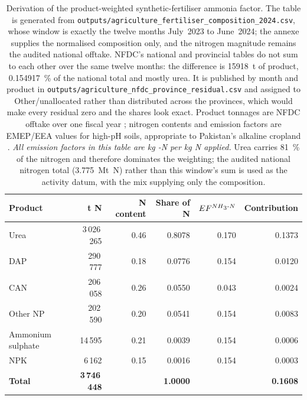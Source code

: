 \begin{table}[!htbp]
\centering
\footnotesize
\begin{tabular}{@{}lrrrrr@{}}
\toprule
\textbf{Product} & \textbf{t N} & \textbf{N content} & \textbf{Share of N}
& \textbf{$EF^{NH\textsubscript{3}{}\text{-}N}$} & \textbf{Contribution} \\
\midrule
Urea             & 3\,026\,265 & 0.46 & 0.8078 & 0.170 & 0.1373 \\
DAP              &   290\,777 & 0.18 & 0.0776 & 0.154 & 0.0120 \\
CAN              &   206\,058 & 0.26 & 0.0550 & 0.043 & 0.0024 \\
Other NP         &   202\,590 & 0.20 & 0.0541 & 0.154 & 0.0083 \\
Ammonium sulphate &   14\,595 & 0.21 & 0.0039 & 0.154 & 0.0006 \\
NPK              &     6\,162 & 0.15 & 0.0016 & 0.154 & 0.0003 \\
\midrule
\textbf{Total}   & \textbf{3\,746\,448} & & \textbf{1.0000} & & \textbf{0.1608} \\
\bottomrule
\end{tabular}
\caption{Derivation of the product-weighted synthetic-fertiliser ammonia factor. The table is
generated from \texttt{outputs/agriculture\_fertiliser\_composition\_2024.csv}, whose window is
exactly the twelve months July~2023 to June~2024; the annexe supplies the normalised composition
only, and the nitrogen magnitude remains the audited national offtake. NFDC's national and
provincial tables do not sum to each other over the same twelve months: the difference is
\SI{15918}{\tonne} of product, \SI{0.154917}{\percent} of the national total and mostly
urea. It is published by month and product in
\texttt{outputs/agriculture\_nfdc\_province\_residual.csv} and assigned to
Other/unallocated rather than distributed across the provinces, which would make every
residual zero and the shares look exact. Product tonnages are
NFDC offtake over one fiscal year \citep{nfdc2024}; nitrogen contents and emission factors are
EMEP/EEA values for high-pH soils, appropriate to Pakistan's alkaline cropland
\citep{emep2023soils}. \emph{All emission factors in this table are kg \NHthree{}-N per kg N
applied.} Urea carries \SI{81}{\percent} of the nitrogen and therefore dominates the weighting; the
audited national nitrogen total (\SI{3.775}{}~Mt~N) rather than this window's sum is used as the
activity datum, with the mix supplying only the composition.}
\label{tab:fertmix}
\end{table}

